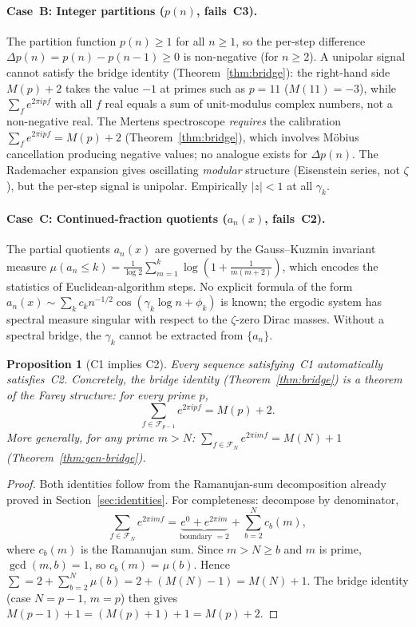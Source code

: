 \documentclass[11pt]{article}
\newtheorem{proposition}[theorem]{Proposition}
\theoremstyle{definition}
\newcommand{\F}{\mathcal{F}}
\begin{document}
\paragraph{Case~B: Integer partitions ($p(n)$, fails~C3).}
The partition function $p(n) \ge 1$ for all $n \ge 1$, so the
per-step difference $\Delta p(n) = p(n) - p(n-1) \ge 0$ is
non-negative (for $n \ge 2$).  A unipolar signal cannot satisfy
the bridge identity (Theorem~\ref{thm:bridge}): the right-hand side
$M(p)+2$ takes the value $-1$ at primes such as $p = 11$ ($M(11) = -3$),
while $\sum_f e^{2\pi i p f}$ with all $f$ real equals a sum of
unit-modulus complex numbers, not a non-negative real.
The Mertens spectroscope \emph{requires} the calibration
$\sum_f e^{2\pi i p f} = M(p)+2$ (Theorem~\ref{thm:bridge}), which
involves Möbius cancellation producing negative values; no analogue
exists for $\Delta p(n)$.  The Rademacher expansion gives oscillating
\emph{modular} structure (Eisenstein series, not $\zeta$), but the
per-step signal is unipolar.  Empirically $|z| < 1$ at all $\gamma_k$.

\paragraph{Case~C: Continued-fraction quotients ($a_n(x)$, fails~C2).}
The partial quotients $a_n(x)$ are governed by the Gauss--Kuzmin
invariant measure $\mu(a_n \le k) = \frac{1}{\log 2}
\sum_{m=1}^k \log(1+\frac{1}{m(m+2)})$, which encodes the
statistics of Euclidean-algorithm steps.  No explicit formula of the
form $a_n(x) \sim \sum_k c_k n^{-1/2}\cos(\gamma_k\log n+\phi_k)$
is known; the ergodic system has spectral measure singular with
respect to the $\zeta$-zero Dirac masses.  Without a spectral
bridge, the $\gamma_k$ cannot be extracted from $\{a_n\}$.

\begin{proposition}[C1 implies C2]\label{prop:c1-implies-c2}
Every sequence satisfying~C1 automatically satisfies~C2.
Concretely, the bridge identity (Theorem~\ref{thm:bridge}) is a
theorem of the Farey structure: for every prime $p$,
\[
  \sum_{f \in \F_{p-1}} e^{2\pi i p f} = M(p) + 2.
\]
More generally, for any prime $m > N$:
$\sum_{f \in \F_N} e^{2\pi i m f} = M(N) + 1$
(Theorem~\ref{thm:gen-bridge}).
\end{proposition}

\begin{proof}
Both identities follow from the Ramanujan-sum decomposition
already proved in Section~\ref{sec:identities}.
For completeness: decompose by denominator,
\[
  \sum_{f \in \F_N} e^{2\pi i m f}
  = \underbrace{e^0 + e^{2\pi i m}}_{\text{boundary }= 2}
  + \sum_{b=2}^{N} c_b(m),
\]
where $c_b(m)$ is the Ramanujan sum.  Since $m > N \ge b$ and
$m$ is prime, $\gcd(m,b)=1$, so $c_b(m) = \mu(b)$.  Hence
$\sum = 2 + \sum_{b=2}^{N}\mu(b) = 2 + (M(N)-1) = M(N)+1$.
The bridge identity (case $N=p-1$, $m=p$) then gives
$M(p-1)+1 = (M(p)+1)+1 = M(p)+2$.
\end{proof}
\end{document}
